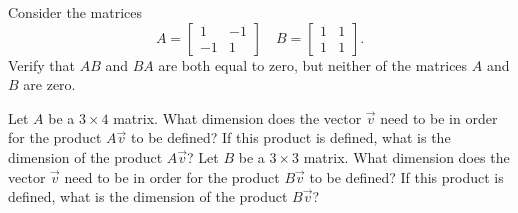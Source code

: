\documentclass{ximera}
\begin{document}
\begin{exercise}
    Consider the matrices
    \begin{equation*}
        A = \begin{bmatrix} 1 & -1 \\ -1 & 1 \end{bmatrix} \quad B = \begin{bmatrix} 1 & 1 \\ 1 & 1 \end{bmatrix}.
    \end{equation*}
    Verify that $AB$ and $BA$ are both equal to zero, but neither of the matrices $A$ and $B$ are zero.
\end{exercise}

\begin{exercise}
    \begin{tasks}
        \task Let $A$ be a $3 \times 4$ matrix. What dimension does the vector $\vec{v}$ need to be in order for the product $A\vec{v}$ to be defined? If this product is defined, what is the dimension of the product $A\vec{v}$?
        \task Let $B$ be a $3 \times 3$ matrix. What dimension does the vector $\vec{v}$ need to be in order for the product $B\vec{v}$ to be defined? If this product is defined, what is the dimension of the product $B\vec{v}$?
    \end{tasks}
\end{exercise}
%
\end{document}
